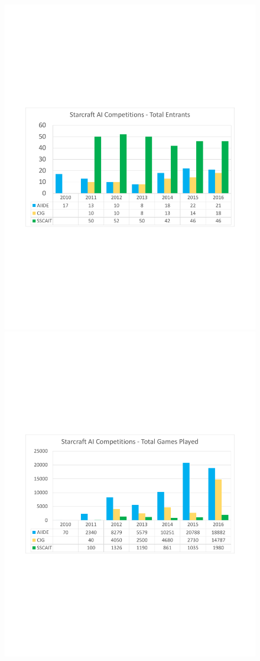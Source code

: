 \begin{figure}[t]
  \begin{center}
  \includegraphics[width=1.3\columnwidth]{fig/Entrants}
	\includegraphics[width=1.3\columnwidth]{fig/GamesPlayed}

\end{center}
\end{figure}

